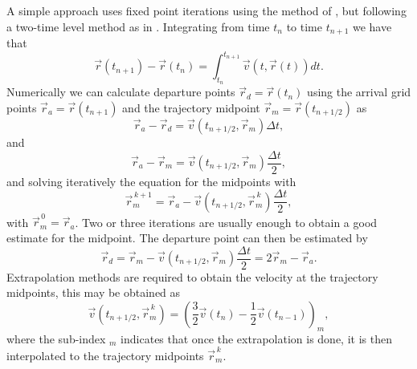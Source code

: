 \documentclass[10pt,a4paper]{article}
\begin{document}
A simple approach uses fixed point iterations using the method of \cite{Robert1981}, but following a two-time level method as in \cite{McDonald1987}. Integrating from time $t_n$ to time $t_{n+1}$ we have that
\begin{equation}
\vec{r}(t_{n+1})-\vec{r}(t_{n}) = \int_{t_n}^{t_{n+1}}\vec{v}(t, \vec{r}(t))dt.
\end{equation}
Numerically we can calculate departure points $\vec{r}_d=\vec{r}(t_{n})$ using the arrival grid points $\vec{r}_a=\vec{r}(t_{n+1})$ and the trajectory midpoint $\vec{r}_m=\vec{r}(t_{n+1/2})$ as
\begin{equation}
\vec{r}_a-\vec{r}_d = \vec{v}(t_{n+1/2}, \vec{r}_m) \Delta t,
\end{equation}
and
\begin{equation}
\vec{r}_a-\vec{r}_m = \vec{v}(t_{n+1/2}, \vec{r}_m) \frac{\Delta t}{2},
\end{equation}
and solving iteratively the equation for the midpoints with
\begin{equation}
\vec{r}^{\,k+1}_m = \vec{r}_a-\vec{v}(t_{n+1/2}, \vec{r}^{\,k}_m) \frac{\Delta t}{2},
\end{equation}
with $\vec{r}^{\,0}_m=\vec{r}_a$. Two or three iterations are usually enough to obtain a good estimate for the midpoint. The departure point can then be estimated by 
\begin{equation}
\vec{r}_d=\vec{r}_m - \vec{v}(t_{n+1/2}, \vec{r}_m) \frac{\Delta t}{2}=2\vec{r}_m-\vec{r}_a.
\end{equation}
Extrapolation methods are required to obtain the velocity at the trajectory midpoints, this may be obtained as
\begin{equation}
\vec{v}(t_{n+1/2}, \vec{r}^{\,k}_m)=\left(\frac{3}{2}\vec{v}(t_{n})-\frac{1}{2}\vec{v}(t_{n-1}) \right)_m,
\label{eq:extrap_simp}
\end{equation}
where the sub-index $_m$ indicates that once the extrapolation is done, it is then interpolated to the trajectory midpoints $\vec{r}^{\,k}_m$.

\end{document}
